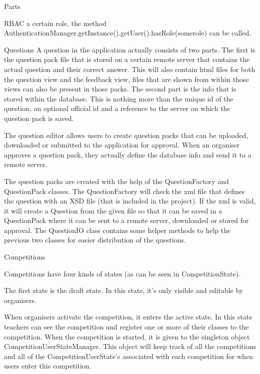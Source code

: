 \documentclass[]{article}
\begin{document}
\begin{section}{Parts}
\begin{subsection}{RBAC}
        a certain role, the method AuthenticationManager.getInstance().getUser().hasRole(somerole)
        can be called.
    \end{subsection}
    \begin{subsection}{Questions}
        A question in the application actually consists of two parts.
        The first is the question pack file that is stored on a certain remote server
        that contains the actual question and their correct answer. This will also contain
        html files for both the question view and the feedback view, files that are shown
        from within those views can also be present in those packs.
        The second part is the info that is stored within the database. This is nothing
        more than the unique id of the question, an optional official id and a reference
        to the server on which the question pack is saved.
        
        The question editor allows users to create question packs that can be uploaded, 
        downloaded or submitted to the application for approval. When an organiser approves
        a question pack, they actually define the database info and send it to a remote server.
        
        The question packs are created with the help of the QuestionFactory and
        QuestionPack classes. The QuestionFactory will check the xml file that defines
        the question with an XSD file (that is included in the project). If the xml is
        valid, it will create a Question from the given file so that it can be saved in
        a QuestionPack where it can be sent to a remote server, downloaded or stored
        for approval. The QuestionIO class contains some helper methods to help the
        previous two classes for easier distribution of the questions.
    \end{subsection}
    \begin{subsection}{Competitions}
    
        Competitions have four kinds of states (as can be seen in CompetitionState).
        
        The first state is the draft state. In this state, it's only visible and editable
        by organisers. 
        
        When organisers activate the competition, it enters the active state. In this state
        teachers can see the competition and register one or more of their classes to the
        competition. When the competition is started, it is given to the singleton object
        CompetitionUserStateManager. This object will keep track of all the competitions
        and all of the CompetitionUserState's associated with each competition for when
        users enter this competition.
        

\end{subsection}
\end{section}
\end{document}
